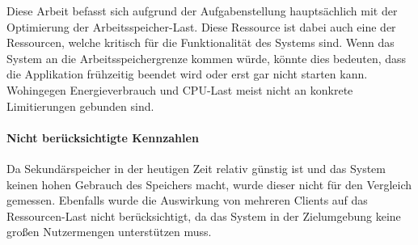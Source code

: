 Diese Arbeit befasst sich aufgrund der Aufgabenstellung hauptsächlich mit der Optimierung der Arbeitsspeicher-Last.
Diese Ressource ist dabei auch eine der Ressourcen, welche kritisch für die Funktionalität des Systems sind.
Wenn das System an die Arbeitsspeichergrenze kommen würde, könnte dies bedeuten, dass die Applikation frühzeitig beendet wird oder erst gar nicht starten kann.
Wohingegen Energieverbrauch und CPU-Last meist nicht an konkrete Limitierungen gebunden sind.

\paragraph*{Nicht berücksichtigte Kennzahlen}

Da Sekundärspeicher in der heutigen Zeit relativ günstig ist und das System keinen hohen Gebrauch des Speichers macht, wurde dieser nicht für den Vergleich gemessen.
Ebenfalls wurde die Auswirkung von mehreren Clients auf das Ressourcen-Last nicht berücksichtigt, da das System in der Zielumgebung keine großen Nutzermengen unterstützen muss.
\newpage


